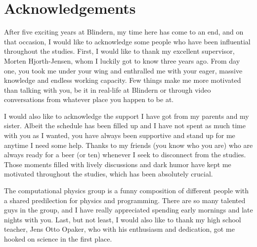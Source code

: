 \thispagestyle{empty}
\cleardoublepage

\section*{Acknowledgements}
After five exciting years at Blindern, my time here has come to an end, and on that occasion, I would like to acknowledge some people who have been influential throughout the studies. First, I would like to thank my excellent supervisor, Morten Hjorth-Jensen, whom I luckily got to know three years ago. From day one, you took me under your wing and enthralled me with your eager, massive knowledge and endless working capacity. Few things make me more motivated than talking with you, be it in real-life at Blindern or through video conversations from whatever place you happen to be at.

I would also like to acknowledge the support I have got from my parents and my sister. Albeit the schedule has been filled up and I have not spent as much time with you as I wanted, you have always been supportive and stand up for me anytime I need some help. Thanks to my friends (you know who you are) who are always ready for a beer (or ten) whenever I seek to disconnect from the studies. Those moments filled with lively discussions and dark humor have kept me motivated throughout the studies, which has been absolutely crucial.

The computational physics group is a funny composition of different people with a shared predilection for physics and programming. There are so many talented guys in the group, and I have really appreciated spending early mornings and late nights with you. Last, but not least, I would also like to thank my high school teacher, Jens Otto Opaker, who with his enthusiasm and dedication, got me hooked on science in the first place.

    
\thispagestyle{empty}
\cleardoublepage

\newpage

{%
    \tableofcontents
    \thispagestyle{empty}
    \clearpage}%

\thispagestyle{empty}
\clearpage


